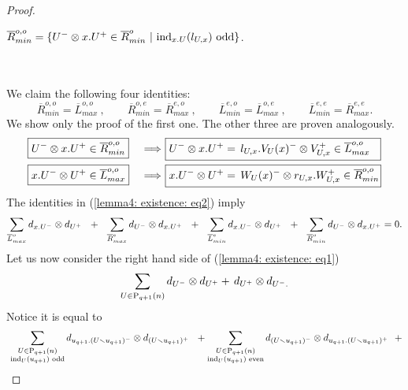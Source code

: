 \begin{proof}
\begin{minipage}{.8\textwidth}
\begin{tab}
\begin{tab}
\begin{tab}
					$\overline{R}_{min}^{o,o} = \{ U^- \otimes x.U^+ \in \overline{R}_{min}^{o}\ | \ \mathrm{ind}_{x.U}(l_{U,x}) \text{ odd} \}$.
				\end{tab}
			\end{tab}
		\end{tab}
	\end{minipage} \\ \\
	We claim the following four identities: 
	\begin{equation}\label{lemma4: existence: eq2}
	\overline{R}_{min}^{o,o} = \overline{L}_{max}^{o,o}\ , \qquad \overline{R}_{min}^{o,e} = \overline{R}_{max}^{e,o}\ , \qquad 
	\overline{L}_{min}^{e,o} = \overline{L}_{max}^{o,e}\ , \qquad \overline{L}_{min}^{e,e} = \overline{R}_{max}^{e,e}.
	\end{equation}
	We show only the proof of the first one. The other three are proven analogously.
	\begin{alignat*}{2}
	&\boxed{U^-\tensor x.U^+ \in \overline{R}_{min}^{o,o}}\ &\Longrightarrow\ &\boxed{U^-\tensor x.U^+ =\, l_{U,x}.V_U(x)^-\tensor V_{U,x}^+ \in \overline{L}_{max}^{o,o} \ \ } \\ 
	&\boxed{x.U^-\tensor U^+ \in \overline{L}_{max}^{o,o}}\ &\Longrightarrow\ &\boxed{x.U^-\tensor U^+ =\, W_U(x)^-\tensor r_{U,x}.W_{U,x}^+ \in \overline{R}_{min}^{o,o} \! }
	\end{alignat*}
	The identities in (\ref{lemma4: existence: eq2}) imply 
	\begin{equation} \label{lemma4: existence: eq3} 
	\sum_{\overline{L}_{max}^{o}} d_{x.U^-} \tensor d_{U^+}\ \ +\ \ 
	\sum_{\overline{R}_{max}^{e}} d_{U^-} \tensor d_{x.U^+}\ \ +\ \ 
	\sum_{\overline{L}_{min}^{e}} d_{x.U^-} \tensor d_{U^+}\ \ +\ \ 
	\sum_{\overline{R}_{min}^{o}} d_{U^-} \tensor d_{x.U^+} = 0.
	\end{equation}
	Let us now consider the right hand side of (\ref{lemma4: existence: eq1})
	\begin{equation*}
	\sum_{U\in\mathrm{P}_{q+1}(n)} d_{U^-} \otimes d_{U^+} +\, d_{U^+} \otimes d_{U^-.}
	\end{equation*}
	Notice it is equal to
	\begin{align*}
	&\, \sum_{\substack{U \in \P_{q+1}(n) \\ \ind_U(u_{q+1}) \text{ odd}}} d_{u_{q+1}.(U \smallsetminus u_{q+1})^-} \tensor d_{(U \smallsetminus u_{q+1})^+}\ \ + 
	\sum_{\substack{U \in \P_{q+1}(n) \\ \ind_U(u_{q+1}) \text{ even}}} d_{(U\smallsetminus u_{q+1})^-} \tensor d_{u_{q+1}.(U \smallsetminus u_{q+1})^+}\ \ + \\

\end{align*}
\end{proof}
